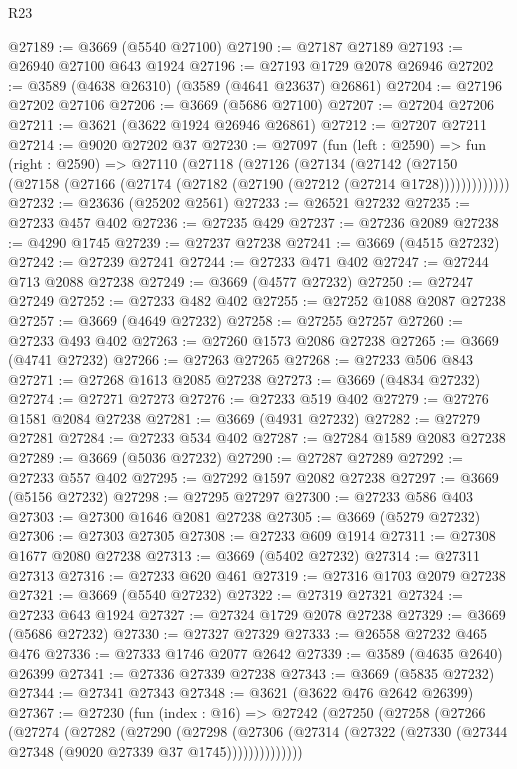 \begin{lexlean}{R23}
\begin{coremodule}
@27189 := @3669 (@5540 @27100)
@27190 := @27187 @27189
@27193 := @26940 @27100 @643 @1924
@27196 := @27193 @1729 @2078 @26946
@27202 := @3589 (@4638 @26310) (@3589 (@4641 @23637) @26861)
@27204 := @27196 @27202 @27106
@27206 := @3669 (@5686 @27100)
@27207 := @27204 @27206
@27211 := @3621 (@3622 @1924 @26946 @26861)
@27212 := @27207 @27211
@27214 := @9020 @27202 @37
@27230 := @27097
    (fun (left : @2590) =>
    fun (right : @2590) =>
    @27110
      (@27118
        (@27126
          (@27134
            (@27142
              (@27150 (@27158 (@27166 (@27174 (@27182 (@27190 (@27212 (@27214 @1728)))))))))))))
@27232 := @23636 (@25202 @2561)
@27233 := @26521 @27232
@27235 := @27233 @457 @402
@27236 := @27235 @429
@27237 := @27236 @2089
@27238 := @4290 @1745
@27239 := @27237 @27238
@27241 := @3669 (@4515 @27232)
@27242 := @27239 @27241
@27244 := @27233 @471 @402
@27247 := @27244 @713 @2088 @27238
@27249 := @3669 (@4577 @27232)
@27250 := @27247 @27249
@27252 := @27233 @482 @402
@27255 := @27252 @1088 @2087 @27238
@27257 := @3669 (@4649 @27232)
@27258 := @27255 @27257
@27260 := @27233 @493 @402
@27263 := @27260 @1573 @2086 @27238
@27265 := @3669 (@4741 @27232)
@27266 := @27263 @27265
@27268 := @27233 @506 @843
@27271 := @27268 @1613 @2085 @27238
@27273 := @3669 (@4834 @27232)
@27274 := @27271 @27273
@27276 := @27233 @519 @402
@27279 := @27276 @1581 @2084 @27238
@27281 := @3669 (@4931 @27232)
@27282 := @27279 @27281
@27284 := @27233 @534 @402
@27287 := @27284 @1589 @2083 @27238
@27289 := @3669 (@5036 @27232)
@27290 := @27287 @27289
@27292 := @27233 @557 @402
@27295 := @27292 @1597 @2082 @27238
@27297 := @3669 (@5156 @27232)
@27298 := @27295 @27297
@27300 := @27233 @586 @403
@27303 := @27300 @1646 @2081 @27238
@27305 := @3669 (@5279 @27232)
@27306 := @27303 @27305
@27308 := @27233 @609 @1914
@27311 := @27308 @1677 @2080 @27238
@27313 := @3669 (@5402 @27232)
@27314 := @27311 @27313
@27316 := @27233 @620 @461
@27319 := @27316 @1703 @2079 @27238
@27321 := @3669 (@5540 @27232)
@27322 := @27319 @27321
@27324 := @27233 @643 @1924
@27327 := @27324 @1729 @2078 @27238
@27329 := @3669 (@5686 @27232)
@27330 := @27327 @27329
@27333 := @26558 @27232 @465 @476
@27336 := @27333 @1746 @2077 @2642
@27339 := @3589 (@4635 @2640) @26399
@27341 := @27336 @27339 @27238
@27343 := @3669 (@5835 @27232)
@27344 := @27341 @27343
@27348 := @3621 (@3622 @476 @2642 @26399)
@27367 := @27230
    (fun (index : @16) =>
    @27242
      (@27250
        (@27258
          (@27266
            (@27274
              (@27282
                (@27290
                  (@27298
                    (@27306
                      (@27314 (@27322 (@27330 (@27344 @27348 (@9020 @27339 @37 @1745))))))))))))))

\end{coremodule}
\end{lexlean}
